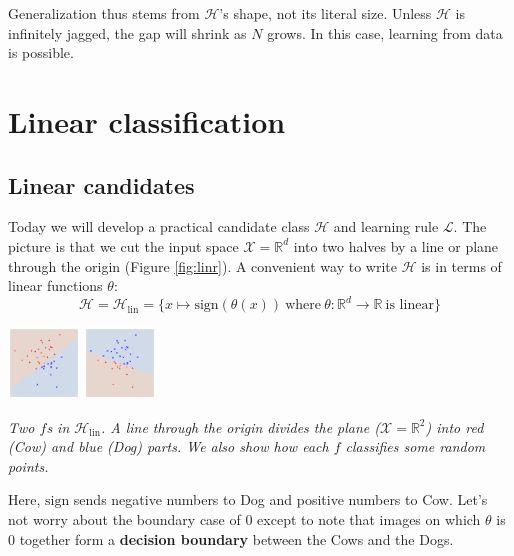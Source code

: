 \documentclass[openany, notitlepage, justified]{tufte-book}
\newcommand{\RR}{\mathbb{R}}
\newcommand{\Hh}{\mathcal{H}}
\newcommand{\Ll}{\mathcal{L}}
\newcommand{\Xx}{\mathcal{X}}
\begin{document}
            Generalization thus stems from $\Hh$'s shape, not its literal size.
            Unless $\Hh$ is infinitely jagged, the gap will shrink as $N$
            grows.  In this case, learning from data is possible.

    \newpage
    \chapter{Linear classification}
        \section{Linear candidates}
            Today we will develop a practical candidate class $\Hh$ and
            learning rule $\Ll$.  The picture is that we cut the input space
            $\Xx=\RR^d$ into two halves by a line or plane through the origin
            (Figure \ref{fig:linr}).
            A convenient way to write $\Hh$ is in terms of linear functions $\theta$:
            $$
                \Hh = \Hh_{\text{lin}} = \{
                    x \mapsto \text{sign}(\theta(x)) 
                    ~\text{where}~
                    \theta : \RR^d \to \RR
                    ~\text{is linear}
                \}
            $$
            {\def\par{\let\par\endgraf}\begin{marginfigure}
                \centering
                \includegraphics[height=1.9cm]{db-linr-a}
                \includegraphics[height=1.9cm]{db-linr-b}
                \caption{\emph{
                    Two $f$s in $\Hh_{\text{lin}}$.
                    A line through the origin divides the plane ($\Xx=\RR^2$)
                    into red (Cow) and blue (Dog) parts.  We also show how each
                    $f$ classifies some random points.
                }}
                \label{fig:linr}
            \end{marginfigure}}%
            Here, $\text{sign}$ sends negative numbers to Dog and positive
            numbers to Cow.  Let's not worry about the boundary case of $0$
            except to note that images on which $\theta$ is $0$ together
            form a \textbf{decision boundary} between the Cows and the Dogs.
\end{document}
